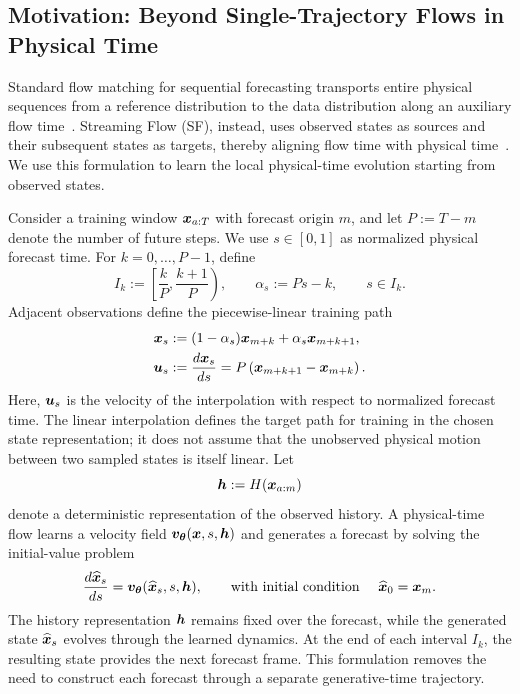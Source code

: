 \documentclass{article} %
\numberwithin{equation}{section}
\begin{document}
\subsection{Motivation: Beyond Single-Trajectory Flows in Physical Time}
\label{sec:physical-time-flow}

Standard flow matching for sequential forecasting transports entire physical sequences from a reference distribution to the data distribution along an auxiliary flow time~\citep{some_ref}. Streaming Flow (SF), instead, uses observed states as sources and their subsequent states as targets, thereby aligning flow time with physical time~\citep{jiang2025streaming,lim2026flow}. We use this formulation to
learn the local physical-time evolution starting from observed states.

Consider a training window ${\bm{x}}_{a:T}$ with forecast origin $m$, and let
$P:=T-m$ denote the number of future steps. We use
$s\in[0,1]$ as normalized physical forecast time. For
$k=0,\ldots,P-1$, define
\begin{equation}
    I_k
    :=
    \left[
        \frac{k}{P},
        \frac{k+1}{P}
    \right),
    \qquad
    \alpha_s:=Ps-k,
    \qquad
    s\in I_k.
    \label{eq:physical_time_interval}
\end{equation}
Adjacent observations define the piecewise-linear training path 
\begin{align}
    {\bm{x}}_s
    &:=
    (1-\alpha_s){\bm{x}}_{m+k}
    +
    \alpha_s{\bm{x}}_{m+k+1},
    \label{eq:physical_time_interpolation}\\
    {\bm{u}}_s
    &:=
    \frac{d{\bm{x}}_s}{ds}
    =
    P\left({\bm{x}}_{m+k+1}-{\bm{x}}_{m+k}\right).
    \label{eq:physical_time_velocity}
\end{align}
Here, ${\bm{u}}_s$ is the velocity of the interpolation with respect to normalized
forecast time. The linear interpolation defines the target 
path for training in the chosen state representation; it does not assume that the
unobserved physical motion between two sampled states is itself linear.
%
Let
\begin{equation}
    {\bm{h}}:=H({\bm{x}}_{a:m})
    \label{eq:history_representation}
\end{equation}
denote a deterministic representation of the observed history. A physical-time flow learns a velocity field
${\bm{v}}_{{\bm{\theta}}}({\bm{x}},s,{\bm{h}})$ and generates a forecast by solving the
initial-value problem
%
\begin{equation}
    \frac{d\widehat{{\bm{x}}}_s}{ds}
    =
    {\bm{v}}_{{\bm{\theta}}}(\widehat{{\bm{x}}}_s,s,{\bm{h}}),
    \qquad
    \text{with initial condition } \quad
    \widehat{{\bm{x}}}_0={\bm{x}}_m.
    \label{eq:deterministic_streaming_flow}
\end{equation}
%
The history representation ${\bm{h}}$ remains fixed over the forecast, while the generated state $\widehat{{\bm{x}}}_s$ evolves through the learned dynamics. At the end of each interval $I_k$, the resulting state provides the next forecast frame. This formulation removes the need to construct each forecast through a separate generative-time trajectory. 
\end{document}
